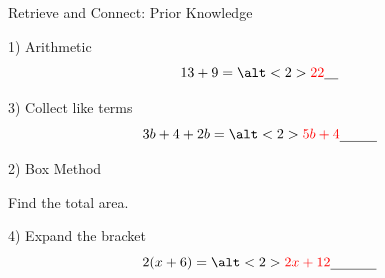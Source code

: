 \documentclass{beamer}
\newcommand{\ablank}[1]{%
  \alt<2>{\textcolor{red}{#1}}{\underline{\phantom{#1}}}%
}
\newcommand{\ashow}[1]{\uncover<2->{\textcolor{red}{\small #1}}}
\newcommand{\ashowq}[1]{\alt<2->{\textcolor{red}{\small #1}}{?}}
\begin{document}
\begin{frame}{Retrieve and Connect: Prior Knowledge}
\begin{minipage}[t]{0.48\textwidth}

\begin{block}{1) Arithmetic}
\Large
\[
13 + 9 = \ablank{22}
\]
\end{block}

\vspace{6.2em}

\begin{block}{3) Collect like terms}
\Large
\[
3b + 4 + 2b = \ablank{5b+4}
\]
\end{block}

\end{minipage}\hfill
\begin{minipage}[t]{0.48\textwidth}

\begin{block}{2) Box Method}
\centering
{}

\vspace{0.4em}
Find the total area. \ashow{Total area $= 32$}

\end{block}

\vspace{0.6em}

\begin{block}{4) Expand the bracket}
\Large
\[
2(x+6) = \ablank{2x+12}
\]
\end{block}

\end{minipage}
\end{frame}
\end{document}
